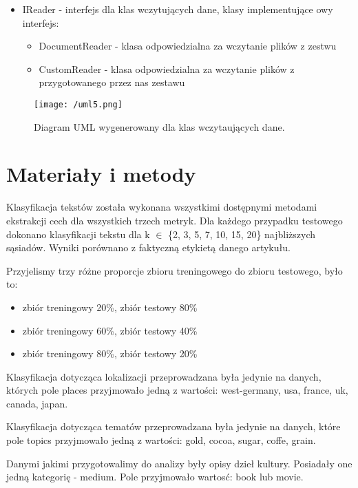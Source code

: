 \documentclass{classrep}
\begin{document}
\begin{itemize}[label=$\bullet$]
\item IReader - interfejs dla klas wczytujących dane, klasy implementujące owy interfejs:
\begin{itemize}
\item DocumentReader -  klasa odpowiedzialna za wczytanie plików z zestwu \cite{data}
\item CustomReader -  klasa odpowiedzialna za wczytanie plików z przygotowanego przez nas zestawu \cite{our}
\end{itemize}
\end{itemize}

\begin{figure}[H]
	\centering
	\texttt{[image: /uml5.png]}
	\caption{Diagram UML wygenerowany dla klas wczytaujących dane.}
\end{figure}

\section{Materiały i metody}
Klasyfikacja tekstów została wykonana wszystkimi dostępnymi metodami ekstrakcji cech dla wszystkich trzech metryk. Dla każdego przypadku testowego dokonano klasyfikacji tekstu dla k $\in$ \{2, 3, 5, 7, 10, 15, 20\} najbliższych sąsiadów. Wyniki porównano z faktyczną etykietą danego artykułu. \newline

Przyjelismy trzy różne proporcje zbioru treningowego do zbioru testowego, było to:
\begin{itemize}
\item zbiór treningowy 20\%, zbiór testowy 80\%
\item zbiór treningowy 60\%, zbiór testowy 40\%
\item zbiór treningowy 80\%, zbiór testowy 20\%
\end{itemize}

Klasyfikacja dotycząca lokalizacji przeprowadzana była jedynie na danych, których pole places przyjmowało jedną z wartości: west-germany, usa, france, uk, canada, japan.
\newline

Klasyfikacja dotycząca tematów przeprowadzana była jedynie na danych, które pole topics przyjmowało jedną z wartości: gold, cocoa, sugar, coffe, grain.\newline

Danymi jakimi przygotowalimy do analizy były opisy dzieł kultury. Posiadały one jedną kategorię - medium. Pole przyjmowało wartosć: book lub movie.
\end{document}
